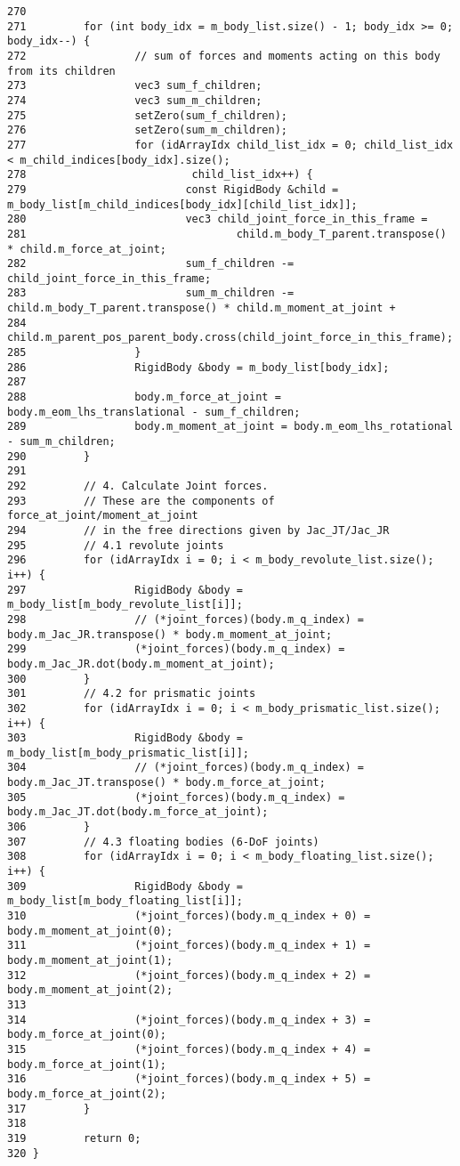 \begin{Code}
\begin{verbatim}
270 
271         for (int body_idx = m_body_list.size() - 1; body_idx >= 0; body_idx--) {
272                 // sum of forces and moments acting on this body from its children
273                 vec3 sum_f_children;
274                 vec3 sum_m_children;
275                 setZero(sum_f_children);
276                 setZero(sum_m_children);
277                 for (idArrayIdx child_list_idx = 0; child_list_idx < m_child_indices[body_idx].size();
278                          child_list_idx++) {
279                         const RigidBody &child = m_body_list[m_child_indices[body_idx][child_list_idx]];
280                         vec3 child_joint_force_in_this_frame =
281                                 child.m_body_T_parent.transpose() * child.m_force_at_joint;
282                         sum_f_children -= child_joint_force_in_this_frame;
283                         sum_m_children -= child.m_body_T_parent.transpose() * child.m_moment_at_joint +
284                                                           child.m_parent_pos_parent_body.cross(child_joint_force_in_this_frame);
285                 }
286                 RigidBody &body = m_body_list[body_idx];
287 
288                 body.m_force_at_joint = body.m_eom_lhs_translational - sum_f_children;
289                 body.m_moment_at_joint = body.m_eom_lhs_rotational - sum_m_children;
290         }
291 
292         // 4. Calculate Joint forces.
293         // These are the components of force_at_joint/moment_at_joint
294         // in the free directions given by Jac_JT/Jac_JR
295         // 4.1 revolute joints
296         for (idArrayIdx i = 0; i < m_body_revolute_list.size(); i++) {
297                 RigidBody &body = m_body_list[m_body_revolute_list[i]];
298                 // (*joint_forces)(body.m_q_index) = body.m_Jac_JR.transpose() * body.m_moment_at_joint;
299                 (*joint_forces)(body.m_q_index) = body.m_Jac_JR.dot(body.m_moment_at_joint);
300         }
301         // 4.2 for prismatic joints
302         for (idArrayIdx i = 0; i < m_body_prismatic_list.size(); i++) {
303                 RigidBody &body = m_body_list[m_body_prismatic_list[i]];
304                 // (*joint_forces)(body.m_q_index) = body.m_Jac_JT.transpose() * body.m_force_at_joint;
305                 (*joint_forces)(body.m_q_index) = body.m_Jac_JT.dot(body.m_force_at_joint);
306         }
307         // 4.3 floating bodies (6-DoF joints)
308         for (idArrayIdx i = 0; i < m_body_floating_list.size(); i++) {
309                 RigidBody &body = m_body_list[m_body_floating_list[i]];
310                 (*joint_forces)(body.m_q_index + 0) = body.m_moment_at_joint(0);
311                 (*joint_forces)(body.m_q_index + 1) = body.m_moment_at_joint(1);
312                 (*joint_forces)(body.m_q_index + 2) = body.m_moment_at_joint(2);
313 
314                 (*joint_forces)(body.m_q_index + 3) = body.m_force_at_joint(0);
315                 (*joint_forces)(body.m_q_index + 4) = body.m_force_at_joint(1);
316                 (*joint_forces)(body.m_q_index + 5) = body.m_force_at_joint(2);
317         }
318 
319         return 0;
320 }
\end{verbatim}
\end{Code}




